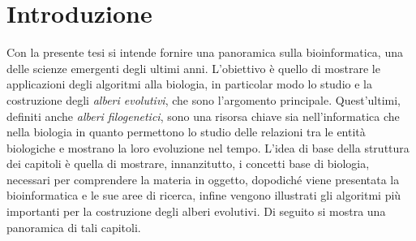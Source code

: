 \chapter*{Introduzione}
 
Con la presente tesi si intende fornire una panoramica sulla bioinformatica, una delle scienze emergenti degli ultimi anni. L'obiettivo è quello di mostrare le applicazioni degli algoritmi alla biologia, in particolar modo lo studio e la costruzione degli \textit{alberi evolutivi}, che sono l'argomento principale.
\newline
Quest'ultimi, definiti anche \textit{alberi filogenetici}, sono una risorsa chiave sia nell'informatica che nella biologia in quanto permettono lo studio delle relazioni tra le entità biologiche e mostrano la loro evoluzione nel tempo.
\newline 
L'idea di base della struttura dei capitoli è quella di mostrare, innanzitutto, i concetti base di biologia, necessari per comprendere la materia in oggetto, dopodiché viene presentata la bioinformatica e le sue aree di ricerca, infine vengono illustrati gli algoritmi più importanti per la costruzione degli alberi evolutivi. Di seguito si mostra una panoramica di tali capitoli.
